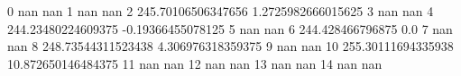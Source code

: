 0 nan nan
1 nan nan
2 245.70106506347656 1.2725982666015625
3 nan nan
4 244.23480224609375 -0.19366455078125
5 nan nan
6 244.428466796875 0.0
7 nan nan
8 248.73544311523438 4.306976318359375
9 nan nan
10 255.30111694335938 10.872650146484375
11 nan nan
12 nan nan
13 nan nan
14 nan nan

